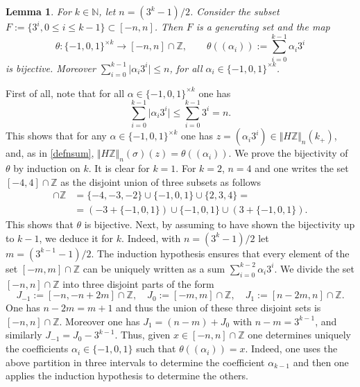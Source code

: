 \documentclass[cupthm]{CUP-JNL-JMJ}
\numberwithin{equation}{section}
\theoremstyle{cupplain}
\newtheorem{lemma}[theorem]{Lemma}
\theoremstyle{cupdefinition}
\theoremstyle{cupremark}
\theoremstyle{cupproof}
\def\N{{\mathbb N}}
\def\Z{{\mathbb Z}}
\begin{document}
\begin{lemma}\label{bijectivecase} For $k\in\N$,  let $n=(3^k-1)/2$. Consider the subset $F:=\{3^i,0\leq i\leq k-1\}\subset [-n,n]$. Then $F$ is a generating set  and the map 
\begin{equation}\label{maptheta}
	\theta:\{-1,0,1\}^{\times k}\to [-n,n]\cap \Z, \qquad \theta((\alpha_i)):=\sum_{i=0}^{k-1} \alpha_i 3^i
	\end{equation}
is bijective. Moreover $\sum_{i=0}^{k-1} \vert \alpha_i 3^i\vert \leq n$,	 for all $\alpha_i\in \{-1,0,1\}^{\times k}$.
	\end{lemma}
\proof First of all, note that for all $\alpha\in \{-1,0,1\}^{\times k}$ one has
\[
\sum_{i=0}^{k-1} \vert \alpha_i 3^i\vert \leq \sum_{i=0}^{k-1} 3^i= n.
\]
This shows that for any $\alpha \in \{-1,0,1\}^{\times k}$ one has $z=(\alpha_i 3^i)\in \Vert H\Z\Vert_n(k_+)$, and, as in \eqref{defnsum}, $\Vert H\Z\Vert_n(\sigma)(z)=\theta((\alpha_i))$.
 We prove the bijectivity of $\theta$ by induction on $k$. It is clear for $k=1$. For $k=2$, $n=4$ and one writes the set $[-4,4]\cap \Z$ as the disjoint union of three subsets as follows
\begin{align*}
[-4,4]\cap \Z&=\{-4,-3,-2\}\cup \{-1,0,1\}\cup \{2,3,4\}=\\
&=(-3+\{-1,0,1\})\cup \{-1,0,1\}\cup (3+\{-1,0,1\}).
\end{align*}
This shows  that  $\theta$ is bijective. Next, by assuming to have shown the bijectivity up to $k-1$, we deduce it for $k$. Indeed, with $n=(3^k-1)/2$ let $m=(3^{k-1}-1)/2$. The induction hypothesis ensures that every element of the set $[-m,m]\cap \Z$ can be uniquely written as a sum $\sum_{i=0}^{k-2} \alpha_i 3^i$. We  divide the set $[-n,n]\cap \Z$ into three disjoint parts of the form 
\[
J_{-1}:=[-n,-n+2m]\cap \Z, \quad J_0:=[-m,m]\cap \Z, \quad J_{1}:=[n-2m,n]\cap \Z.
\]
One has $n-2m=m+1$ and thus the union of these three disjoint sets is $[-n,n]\cap \Z$. Moreover one has $J_{1}=(n-m)+J_0$ with $n-m=3^{k-1}$, and similarly $J_{-1}=J_0-3^{k-1}$. Thus, given $x\in [-n,n]\cap \Z$ one determines uniquely the coefficients $\alpha_i\in \{-1,0,1\}$ such that $\theta((\alpha_i))=x$. Indeed,  one uses the above partition in three intervals to determine the coefficient $\alpha_{k-1}$ and then one applies the induction hypothesis to determine the  others. \endproof 
\end{document}
